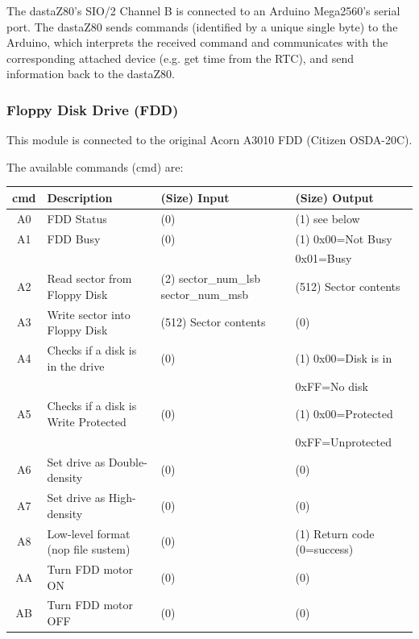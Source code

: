 \documentclass[a4paper,11pt]{article}
\begin{document}
    The dastaZ80's SIO/2 Channel B is connected to an Arduino Mega2560's serial
    port. The dastaZ80 sends commands (identified by a unique single byte) to
    the Arduino, which interprets the received command and communicates with the
    corresponding attached device (e.g. get time from the RTC), and send
    information back to the dastaZ80.

    \subsubsection{Floppy Disk Drive (FDD)}

    This module is connected to the original Acorn A3010 FDD (Citizen OSDA-20C).

    The available commands (cmd) are:
 
     \begin{tabular}{| c | m{3.8cm} | m{3cm} | m{3.5cm} | }
         \hline
         \rowcolor{lightgray}
         cmd & Description & (Size) Input & (Size) Output\\
         \hline
         A0 & FDD Status & (0) & (1) see below\\
         \hline
         A1 & FDD Busy & (0) & (1) 0x00=Not Busy\\
            &          &     &     0x01=Busy\\
         \hline
         A2 & Read sector from Floppy Disk & (2) sector\_num\_lsb sector\_num\_msb & (512) Sector contents\\
         \hline
         A3 & Write sector into Floppy Disk & (512) Sector contents & (0) \\
         \hline
         A4 & Checks if a disk is in the drive & (0) & (1) 0x00=Disk is in\\
            &                                  &     &     0xFF=No disk\\
         \hline
         A5 & Checks if a disk is Write Protected & (0) & (1) 0x00=Protected\\
            &                                     &     &     0xFF=Unprotected\\
         \hline
         A6 & Set drive as Double-density & (0) & (0)\\
         \hline
         A7 & Set drive as High-density & (0) & (0)\\
         \hline
         A8 & Low-level format (nop file sustem) & (0) & (1) Return code (0=success)\\
         \hline
         AA & Turn FDD motor ON & (0) & (0)\\
         \hline
         AB & Turn FDD motor OFF & (0) & (0)\\
         \hline
     \end{tabular}
\end{document}
